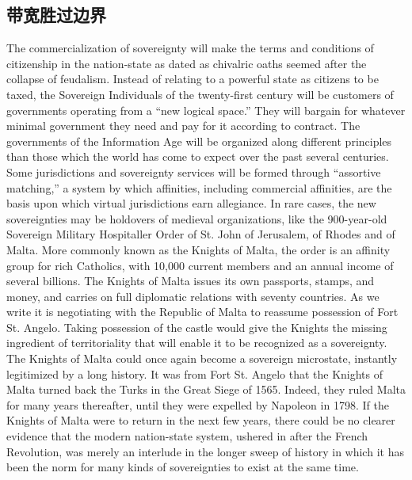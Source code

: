 \begin{Parallel}{97mm}{45mm}

\section{带宽胜过边界}

  \ParallelLText
  {The commercialization of sovereignty will make the terms and conditions of citizenship in the nation-state as dated as chivalric oaths seemed after the collapse of feudalism. Instead of relating to a powerful state as citizens to be taxed, the Sovereign Individuals of the twenty-first century will be customers of governments operating from a “new logical space.” They will bargain for whatever minimal government they need and pay for it according to contract. The governments of the Information Age will be organized along different principles than those which the world has come to expect over the past several centuries. Some jurisdictions and sovereignty services will be formed through “assortive matching,” a system by which affinities, including commercial affinities, are the basis upon which virtual jurisdictions earn allegiance. In rare cases, the new sovereignties may be holdovers of medieval organizations, like the 900-year-old Sovereign Military Hospitaller Order of St. John of Jerusalem, of Rhodes and of Malta. More commonly known as the Knights of Malta, the order is an affinity group for rich Catholics, with 10,000 current members and an annual income of several billions. The Knights of Malta issues its own passports, stamps, and money, and carries on full diplomatic relations with seventy countries. As we write it is negotiating with the Republic of Malta to reassume possession of Fort St. Angelo. Taking possession of the castle would give the Knights the missing ingredient of territoriality that will enable it to be recognized as a sovereignty. The Knights of Malta could once again become a sovereign microstate, instantly legitimized by a long history. It was from Fort St. Angelo that the Knights of Malta turned back the Turks in the Great Siege of 1565. Indeed, they ruled Malta for many years thereafter, until they were expelled by Napoleon in 1798. If the Knights of Malta were to return in the next few years, there could be no clearer evidence that the modern nation-state system, ushered in after the French Revolution, was merely an interlude in the longer sweep of history in which it has been the norm for many kinds of sovereignties to exist at the same time. }
  

\end{Parallel}
